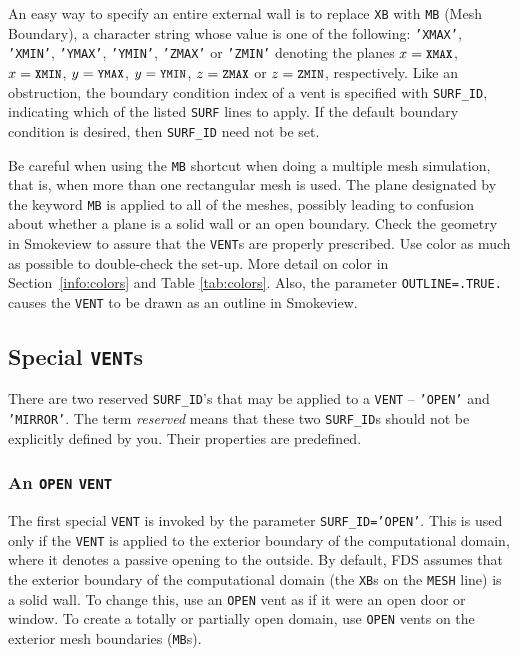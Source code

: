 \documentclass[11pt]{book}
\newcommand{\ct}{\tt\small}
\begin{document}
\noindent
An easy way to specify an entire external wall is to replace {\ct XB} with
{\ct MB} (Mesh Boundary), a character string whose value is one of the following:
{\ct 'XMAX'}, {\ct 'XMIN'}, {\ct 'YMAX'}, {\ct 'YMIN'}, {\ct 'ZMAX'} or
{\ct 'ZMIN'} denoting the planes $x=\hbox{\ct XMAX}$, $x=\hbox{\ct XMIN}$,
$y=\hbox{\ct YMAX}$, $y=\hbox{\ct YMIN}$, $z=\hbox{\ct ZMAX}$
or $z=\hbox{\ct ZMIN}$, respectively.
Like an obstruction, the boundary condition index of a vent is specified
with {\ct SURF\_ID}, indicating which of the listed {\ct SURF} lines to
apply. If the default boundary condition is desired, then {\ct SURF\_ID} need not be set.

Be careful when using the {\ct MB} shortcut when doing a multiple mesh
simulation, that is, when more than one rectangular mesh is used. The
plane designated by the keyword {\ct MB} is applied to all of the
meshes, possibly leading to confusion about whether a plane is a solid
wall or an open boundary. Check the geometry in Smokeview to assure that
the {\ct VENT}s are properly prescribed. Use color as much as
possible to double-check the set-up.  More detail on color in
Section~\ref{info:colors} and Table \ref{tab:colors}. Also, the parameter {\ct OUTLINE=.TRUE.} causes the
{\ct VENT} to be drawn as an outline in Smokeview.


\subsection{Special {\tt VENT}s}

There are two reserved {\ct SURF\_ID}'s that may be applied to a {\ct VENT} -- {\ct 'OPEN'} and {\ct 'MIRROR'}. The term {\em reserved} means that these two
{\ct SURF\_ID}s should not be explicitly defined by you. Their properties are predefined.

\subsubsection{An {\tt OPEN} {\tt VENT}}

The first special {\ct VENT} is invoked by the parameter {\ct SURF\_ID='OPEN'}. This is used only if the {\ct VENT}
is applied to the exterior boundary of the computational domain, where
it denotes a passive opening to the outside. By default, FDS assumes that the exterior boundary of the computational domain (the {\ct XB}s on the {\ct MESH} line) is a solid wall. To
change this, use an {\ct OPEN} vent as if it were an open door or window. To create a totally or partially open domain, use {\ct OPEN} vents on the exterior mesh boundaries ({\ct MB}s).
\end{document}
